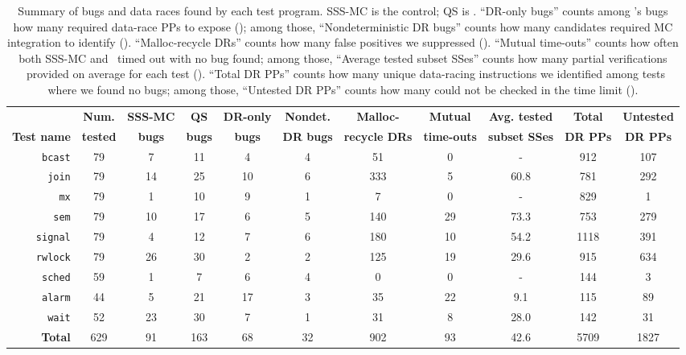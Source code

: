 \begin{table}[t]
	\begin{center}
		\small
	\begin{tabular}{r|c||c|c|c|c|c||c|c||c|c}
		& {\bf Num.} & {\bf SSS-MC} & {\bf QS} & {\bf DR-only} & {\bf Nondet.} & {\bf Malloc-} &
		{\bf Mutual} & {\bf Avg. tested} & {\bf Total} & {\bf Untested} \\
		{\bf Test name} & {\bf tested} & {\bf bugs} & {\bf bugs} & {\bf bugs} & {\bf DR bugs} & {\bf recycle DRs} &
		{\bf time-outs} & {\bf subset SSes} & {\bf DR PPs} & {\bf DR PPs} \\
		\hline
		{\tt bcast}	& 79	& 7	& 11	& 4	& 4	& 51	& 0	& -	& 912	& 107	\\
		{\tt join} 	& 79	& 14 	& 25	& 10	& 6	& 333	& 5	& 60.8	& 781	& 292	\\
		{\tt mx} 	& 79	& 1	& 10	& 9	& 1	& 7	& 0	& -	& 829	& 1	\\
		{\tt sem} 	& 79	& 10	& 17	& 6	& 5	& 140	& 29	& 73.3	& 753	& 279	\\
		{\tt signal} 	& 79	& 4	& 12	& 7	& 6	& 180	& 10	& 54.2	& 1118	& 391	\\
		{\tt rwlock} 	& 79	& 26	& 30	& 2	& 2	& 125	& 19	& 29.6	& 915	& 634	\\
		\hline
		{\tt sched} 	& 59	& 1	& 7	& 6	& 4	& 0	& 0	& -	& 144	& 3	\\
		{\tt alarm} 	& 44	& 5	& 21	& 17	& 3	& 35 	& 22	& 9.1	& 115	& 89	\\
		{\tt wait} 	& 52	& 23	& 30	& 7	& 1	& 31	& 8	& 28.0	& 142	& 31	\\
		\hline
		{\bf Total}	& 629	& 91	& 163	& 68	& 32	& 902	& 93	& 42.6 	& 5709	& 1827	\\
	\end{tabular}
	\end{center}
	\caption{Summary of bugs and data races found by each test program.
		SSS-MC is the control; QS is \quicksand.
		``DR-only bugs'' counts among \quicksand's bugs how many required data-race PPs to expose (\sect{\ref{sec:eval-sssmc}});
	among those, ``Nondeterministic DR bugs'' counts how many candidates required MC integration to identify (\sect{\ref{sec:eval-falseneg}}).
	``Malloc-recycle DRs'' counts how many false positives we suppressed (\sect{\ref{sec:eval-falsepos}}).
	``Mutual time-outs'' counts how often both SSS-MC and \quicksand~timed out with no bug found;
	among those, ``Average tested subset SSes'' counts how many partial verifications \quicksand~provided on average for each test (\sect{\ref{sec:eval-sssmc}}).
	``Total DR PPs'' counts how many unique data-racing instructions we identified among tests where we found no bugs;
	among those, ``Untested DR PPs'' counts how many could not be checked in the time limit (\sect{\ref{sec:future}}).
		}
	\label{tab:drbugs}
\end{table}

